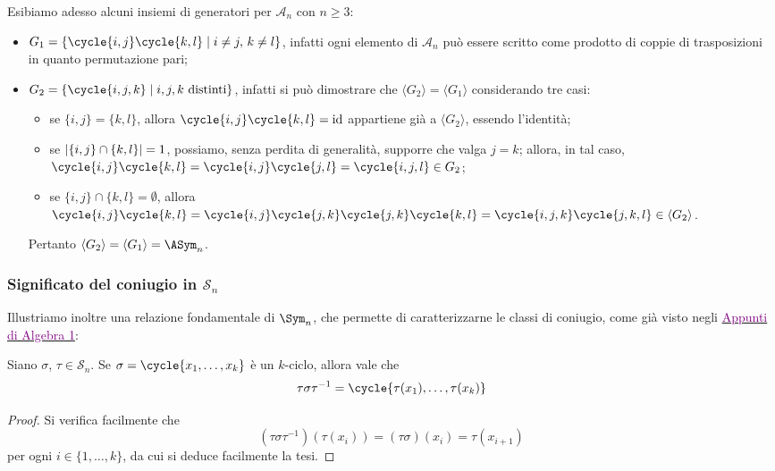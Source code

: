 \documentclass[11pt]{scrartcl}
\begin{document}
	Esibiamo adesso alcuni insiemi di generatori per $\mathcal{A}_n$ con $n \geq 3$:
	\begin{itemize}
		\item $G_1 = \{\cycle{i, j}\cycle{k, l}\mid i\neq j, \, k \neq l\}$, infatti
		ogni elemento di $\mathcal{A}_n$ può essere scritto come prodotto di 
		coppie di trasposizioni in quanto permutazione pari;
		\item $G_2 = \{\cycle{i, j, k}\mid i, j, k\text{ distinti}\}$, infatti si
		può dimostrare che $\langle G_2 \rangle = \langle G_1 \rangle$ considerando
		tre casi:
		\begin{itemize}
			\item se $\{i, j\} = \{k, l\}$, allora $\cycle{i, j}\cycle{k, l} = \id$
			appartiene già a $\langle G_2 \rangle$, essendo l'identità;
			\item se $\left\lvert \{i, j\}\cap\{k, l\} \right\rvert = 1$, possiamo, senza perdita di
			generalità, supporre che valga $j = k$; allora, in tal caso,
			$\cycle{i, j}\cycle{k, l} = \cycle{i, j}\cycle{j, l} = \cycle{i, j, l} \in G_2$;
			\item se $\{i, j\}\cap\{k, l\} = \emptyset$, allora
			$\cycle{i, j} \cycle{k, l} = \cycle{i, j} \cycle{j, k} \cycle{j, k} \cycle{k, l} =
			\cycle{i, j, k} \cycle{j, k, l} \in \langle G_2 \rangle$.
		\end{itemize}
		Pertanto $\langle G_2 \rangle = \langle G_1 \rangle = \ASym_n$.
	\end{itemize}
	
	\subsubsection{Significato del coniugio in \texorpdfstring{$\mathcal{S}_n$}{Sₙ}}
	
	Illustriamo inoltre una relazione fondamentale di $\Sym_n$, che permette di
	caratterizzarne le classi di coniugio, come già visto negli \href{https://github.com/diego-unipi/Algebra-1}{\textcolor{purple}{Appunti di Algebra 1}}:
	
	\begin{lemma}
		\label{lemma1.56}
		Siano $\sigma$, $\tau \in \mathcal{S}_n$. Se $\sigma = \cycle{x_1, \ldots, x_k}$ è un 
		$k$-ciclo, allora vale che
		\[
		\tau\sigma\tau^{-1} = \cycle{\tau(x_1),\ldots, \tau(x_k)}
		\]
	\end{lemma}
	
	\begin{proof}
		Si verifica facilmente che
		\[
		(\tau\sigma\tau^{-1})(\tau(x_i)) = (\tau\sigma)(x_i) = \tau(x_{i + 1})
		\]per ogni $i \in \{1, \ldots, k\}$, da cui si deduce facilmente la tesi.
	\end{proof}
	
\end{document}
